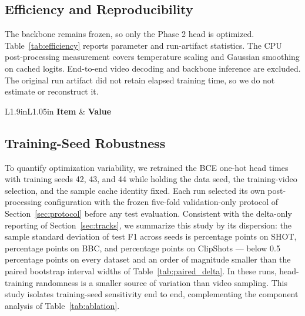 \subsection{Efficiency and Reproducibility}

The backbone remains frozen, so only the Phase 2 head is optimized.
Table~\ref{tab:efficiency} reports parameter and run-artifact statistics.
The CPU post-processing measurement covers temperature scaling and Gaussian
smoothing on cached logits. End-to-end video decoding and backbone inference
are excluded. The original run artifact did not retain elapsed training time,
so we do not estimate or reconstruct it.

\begin{table}[!t]
\caption{Efficiency and Run-Artifact Statistics}
\label{tab:efficiency}
\centering
\small
\renewcommand{\arraystretch}{1.06}
\begin{tabular}{L{1.9in}L{1.05in}}
\toprule
\textbf{Item} & \textbf{Value} \\
\midrule
\PaperEfficiencyRows
\bottomrule
\end{tabular}
\end{table}



\subsection{Training-Seed Robustness}
\label{sec:seed_robustness}

To quantify optimization variability, we retrained the BCE one-hot head
\PaperSeedCount{} times with training seeds 42, 43, and 44 while holding the
data seed, the training-video selection, and the sample cache identity fixed.
Each run selected its own post-processing configuration with the frozen
five-fold validation-only protocol of Section~\ref{sec:protocol} before any
test evaluation. Consistent with the delta-only reporting of
Section~\ref{sec:tracks}, we summarize this study by its dispersion: the
sample standard deviation of test F1 across seeds is
\PaperSeedShotFOneStd{} percentage points on SHOT,
\PaperSeedBBCFOneStd{} percentage points on BBC, and
\PaperSeedClipFOneStd{} percentage points on ClipShots --- below
0.5 percentage points on every dataset and an
order of magnitude smaller than the paired bootstrap interval widths of
Table~\ref{tab:paired_delta}. In these runs, head-training randomness is a
smaller source of variation than video sampling. This study isolates
training-seed sensitivity end to end, complementing the component analysis of
Table~\ref{tab:ablation}.


